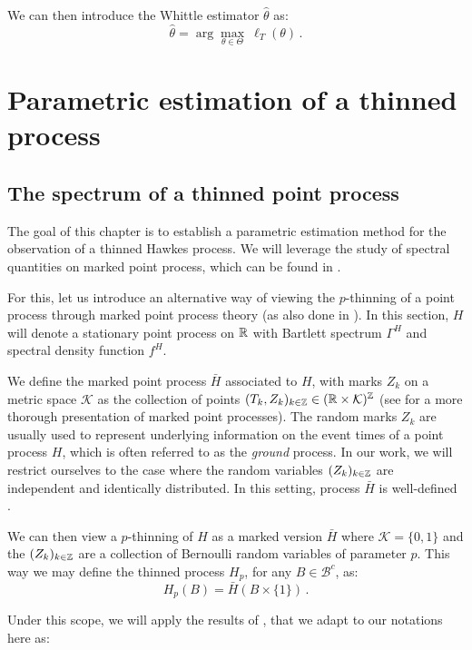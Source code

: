 We can then introduce the Whittle estimator $\hat \theta$ \parencite{Whittle1952} as:
\[\hat \theta = \arg\max_{\theta \in \Theta}~ \ell_T (\theta)\,.\]

\section{Parametric estimation of a thinned process}\label{sec:chap5_estimation}

    \subsection{The spectrum of a thinned point process}\label{sec:chap5_thinned_spectrum}

The goal of this chapter is to establish a parametric estimation method for the observation of a thinned Hawkes process.
We will leverage the study of spectral quantities on marked point process, 
which can be found in \textcite{Bremaud2002, Bremaud2005}. 

For this, let us introduce an alternative way of viewing the $p$-thinning of a point process through marked point process theory (as also done in \textcite{Cronie2024}).
In this section, $H$ will denote a stationary point process on ${\mathbb R}$ with Bartlett spectrum $\Gamma^H$ and spectral density function $f^H$.

We define the marked point process $\bar H$ associated to $H$, with marks $Z_k$ on a metric space $\mathcal{K}$ as the collection of points
$(T_k, Z_k)_{k\in{\mathbb Z}} \in ({\mathbb R} \times \mathcal{K})^{{\mathbb Z}}$ (see \textcite[Chapter 6.4]{DaleyV1} for a more thorough presentation of marked point processes). 
The random marks $Z_k$ are usually used to represent underlying information on the event times of a point process $H$, 
which is often referred to as the \textit{ground} process.
In our work, we will restrict ourselves to the case where the random variables $(Z_k)_{k\in{\mathbb Z}}$ are independent and identically distributed.
In this setting, process $\bar H$ is well-defined \parencite[6.4.IV(a)]{DaleyV1}.

We can then view a $p$-thinning of $H$ as a marked version $\bar H$ where $\mathcal{K} = \{0,1\}$
and the $(Z_k)_{k\in{\mathbb Z}}$ are a collection of Bernoulli random variables of parameter $p$.
This way we may define the thinned process $H_p$, for any $B\in\mathcal{B}^c$, as:
\[H_p(B) = \bar H(B\times\{1\})\,.\]

Under this scope, we will apply the results of \textcite{Bremaud2005}, 
that we adapt to our notations here as:


